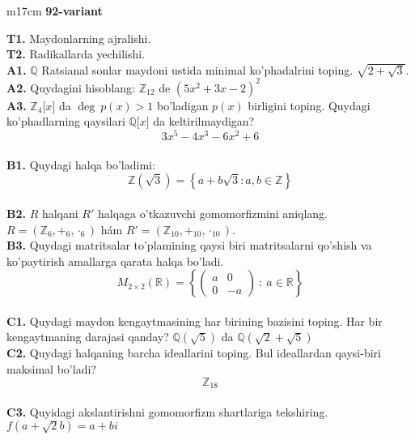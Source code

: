 \documentclass{article}
\begin{document}
\begin{tabular}{m{17cm}}
\textbf{92-variant}
\newline

\textbf{T1.} Maydonlarning ajralishi. \\
\textbf{T2.} Radikallarda yechilishi. \\
\textbf{A1.} \(\mathbb{Q}\) Ratsianal sonlar maydoni ustida minimal ko'phadalrini toping.
\(\sqrt{2 + \sqrt{3}}\). \\
\textbf{A2.} Quydagini hisoblang:
\(\mathbb{Z}_{12}\) de \(\left( 5x^{2} + 3x - 2 \right)^{2}\) \\
\textbf{A3.} \(\mathbb{Z}_{4}\lbrack x\rbrack\) da \(\deg\ p(x) > 1\) bo'ladigan \(p(x)\) birligini toping. Quydagi ko'phadlarning qaysilari \(\mathbb{Q\lbrack}x\rbrack\) da keltirilmaydigan?
\[3x^{5} - 4x^{3} - 6x^{2} + 6\] \\
\textbf{B1.} Quydagi halqa bo'ladimi:
\[\mathbb{Z}\left( \sqrt{3} \right) = \left\{ a + b\sqrt{3}:a,b \in \mathbb{Z} \right\}\] \\
\textbf{B2.} \(R\) halqani \(R'\) halqaga o'tkazuvchi gomomorfizmini aniqlang.
\(R = (\mathbb{Z}_{6}, +_{6}, \cdot_{6})\) hám \(R' = (\mathbb{Z}_{10}, +_{10}, \cdot_{10})\). \\
\textbf{B3.} Quydagi matritsalar to'plamining qaysi biri matritsalarni qo'shish va ko'paytirish amallarga qarata halqa bo'ladi.
\[M_{2 \times 2}\mathbb{(R) =}\left\{ \begin{pmatrix}
a & 0 \\
0 & - a
\end{pmatrix}\ :\ a \in \mathbb{R} \right\}\] \\
\textbf{C1.} Quydagi maydon kengaytmasining har birining bazisini toping. Har bir kengaytmaning darajasi qanday?
\(\mathbb{Q}\left( \sqrt{5} \right)\) da \(\mathbb{Q}\left( \sqrt{2} + \sqrt{5} \right)\) \\
\textbf{C2.} Quydagi halqaning barcha ideallarini toping. Bul ideallardan qaysi-biri maksimal bo'ladi?
\[\mathbb{Z}_{18}\] \\
\textbf{C3.} Quyidagi akslantirishni gomomorfizm shartlariga tekshiring. \(f\left( a + \sqrt{2}b \right) = a + bi\) \\

\end{tabular}
\vspace{1cm}
\end{document}
